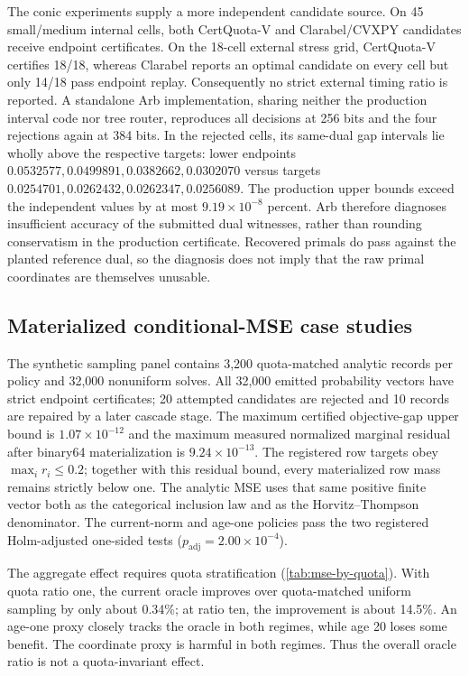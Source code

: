 \documentclass[smallextended,envcountsect]{svjour3}
\begin{document}
The conic experiments supply a more independent candidate source.  On 45
small/medium internal cells, both CertQuota-V and Clarabel/CVXPY candidates
receive endpoint certificates.  On the 18-cell external stress grid,
CertQuota-V certifies 18/18, whereas Clarabel reports an optimal candidate on
every cell but only 14/18 pass endpoint replay.  Consequently no strict
external timing ratio is reported.  A standalone Arb implementation, sharing
neither the production interval code nor tree router, reproduces all
\AFTwoIndependentReplays{} decisions at 256 bits and the four rejections again
at 384 bits.  In the rejected cells, its same-dual gap intervals lie wholly
above the respective targets: lower endpoints
$0.0532577,0.0499891,0.0382662,0.0302070$ versus targets
$0.0254701,0.0262432,0.0262347,0.0256089$.  The production upper bounds exceed
the independent values by at most $9.19\times10^{-8}$ percent.  Arb therefore
diagnoses insufficient accuracy of the submitted dual witnesses, rather than
rounding conservatism in the production certificate.  Recovered primals do
pass against the planted reference dual, so the diagnosis does not imply that
the raw primal coordinates are themselves unusable.

\subsection{Materialized conditional-MSE case studies}
\label{sec:results-mse}

The synthetic sampling panel contains 3,200 quota-matched analytic records per
policy and 32,000 nonuniform solves.  All 32,000 emitted probability vectors
have strict endpoint certificates; 20 attempted candidates are rejected and
10 records are repaired by a later cascade stage.  The maximum certified
objective-gap upper bound is $1.07\times10^{-12}$ and the maximum measured
normalized marginal residual after binary64 materialization is
$9.24\times10^{-13}$.  The registered row targets obey
$\max_i r_i\le0.2$; together with this residual bound, every materialized row
mass remains strictly below one.  The analytic MSE uses that same positive
finite vector both as the categorical inclusion law and as the
Horvitz--Thompson denominator.  The current-norm and age-one policies pass the two
registered Holm-adjusted one-sided tests ($p_{\mathrm{adj}}=2.00\times10^{-4}$).

The aggregate effect requires quota stratification
(\cref{tab:mse-by-quota}).  With quota ratio one, the current oracle improves
over quota-matched uniform sampling by only about 0.34\%; at ratio ten, the
improvement is about 14.5\%.  An age-one proxy closely tracks the oracle in
both regimes, while age 20 loses some benefit.  The coordinate proxy is harmful
in both regimes.  Thus the overall oracle ratio
\AFTwoEstimatorOracleMSE{} is not a quota-invariant effect.
\end{document}
